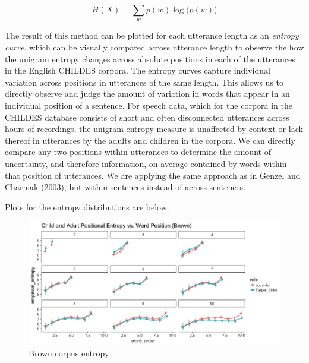 \documentclass[10pt, letterpaper]{article}
\newenvironment{CodeChunk}{}{}
\begin{document}
\[H(X) = \sum\limits_w p(w)\log\big(p(w)\big)\]

The result of this method can be plotted for each utterance length as an
\emph{entropy curve}, which can be visually compared across utterance
length to observe the how the unigram entropy changes across absolute
positions in each of the utterances in the English CHILDES corpora. The
entropy curves capture individual variation across positions in
utterances of the same length. This allows us to directly observe and
judge the amount of variation in words that appear in an individual
position of a sentence. For speech data, which for the corpora in the
CHILDES database consists of short and often disconnected utterances
across hours of recordings, the unigram entropy measure is unaffected by
context or lack thereof in utterances by the adults and children in the
corpora. We can directly compare any two positions within utterances to
determine the amount of uncertainty, and therefore information, on
average contained by words within that position of utterances. We are
applying the same approach as in Genzel and Charniak (2003), but within
sentences instead of across sentences.

Plots for the entropy distributions are below.

\begin{CodeChunk}
\begin{figure}[h]

{\centering \includegraphics{figs/brown_PE-1} 

}

\caption[Brown corpus entropy]{Brown corpus entropy}\label{fig:brown_PE}
\end{figure}
\end{CodeChunk}
\end{document}
